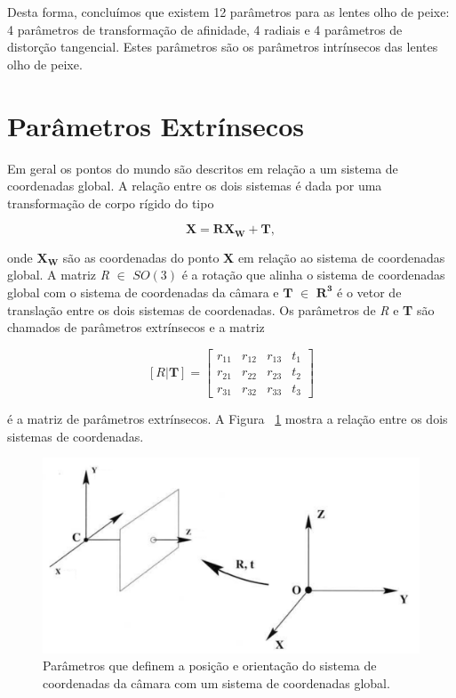 Desta forma, concluímos que existem 12 parâmetros para as lentes olho de peixe: 4 parâmetros de transformação de afinidade, 4 radiais e 4 parâmetros de distorção tangencial. Estes parâmetros são os parâmetros intrínsecos das lentes olho de peixe.




\section{Parâmetros Extrínsecos}

Em geral os pontos do mundo são descritos em relação a um sistema de coordenadas global. A relação entre os dois sistemas é dada por uma transformação de corpo rígido do tipo

\[ \textbf{X} = \textbf{R}\textbf{X}_\textbf{W} + \textbf{T},  \]

onde $\textbf{X}_\textbf{W}$ são as coordenadas do ponto \textbf{X} em relação ao sistema de coordenadas global. A matriz \textit{R} $\in$ \textit{$SO(3)$} é a rotação que alinha o sistema de coordenadas global com o sistema de coordenadas da câmara e $\textbf{T}$ $\in$ $\mathbf{R^3}$ é o vetor de translação entre os dois sistemas de coordenadas. Os parâmetros de \textit{R} e \textbf{T} são chamados de parâmetros extrínsecos e a matriz 

\[ [\textit{R}|\textbf{T}] = \left[ \begin{array}{cccc}
r_{11} & r_{12} & r_{13} & t_1 \\ 
r_{21} & r_{22} & r_{23} & t_2 \\ 
r_{31} & r_{32} & r_{33} & t_3
\end{array} \right] \]

é a matriz de parâmetros extrínsecos. A Figura ~\ref{fig:parExt} mostra a relação entre os dois sistemas de coordenadas.

\begin{figure}[h!]
	\centering
	\includegraphics[width=0.7\linewidth]{figures/parExt}
	\caption{Parâmetros que definem a posição e orientação do sistema de coordenadas da câmara com um sistema de coordenadas global.}
	\label{fig:parExt}
\end{figure}


